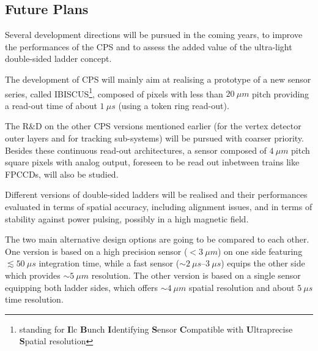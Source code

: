 \subsection{Future Plans}

Several development directions will be pursued in the coming years,
to improve the performances of the CPS and to assess the added value
of the ultra-light double-sided ladder concept.

The development of CPS will mainly aim at realising a prototype of
a new sensor series, called IBISCUS\footnote{standing for {\bf I}lc
{\bf B}unch {\bf I}dentifying {\bf S}ensor {\bf C}ompatible with
{\bf U}ltraprecise {\bf S}patial resolution},
composed of pixels with less than $\SI{20}{\mu m}$ pitch providing a
read-out time of about $\SI{1}{\mu s}$ (using a token ring read-out).

The R\&D on the other CPS versions mentioned earlier (for the vertex
detector outer layers and for tracking sub-systems) will be pursued
with coarser priority.
Besides these continuous read-out architectures, a sensor composed
of $\SI{4}{\mu m}$ pitch square pixels with analog output, foreseen to be
read out inbetween trains like FPCCDs, will also be studied.


Different versions of double-sided ladders will be realised and
their performances evaluated in terms of spatial accuracy, including
alignment issues, and in terms of stability against power pulsing,
possibly in a high magnetic field.

The two main alternative design options are going to be compared
to each other. One version is based on a high precision sensor
($<\SI{3}{\mu m}$) on one side featuring $\lesssim\SI{50}{\mu s}$ integration
time, while a fast sensor ($\sim\SIrange{2}{3}{\mu s}$) equips the other side
which provides $\sim\SI{5}{\mu m}$ resolution. The other version is based
on a single sensor equipping both ladder sides, which offers $\sim\SI{4}{\mu m}$
spatial resolution and about $\SI{5}{\mu s}$ time resolution.
